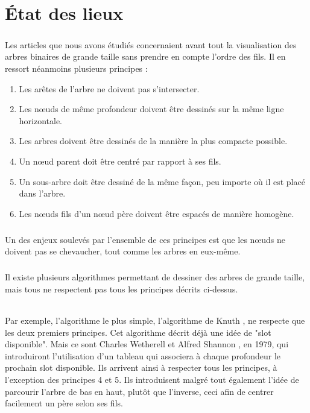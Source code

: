 \chapter{État des lieux}

\paragraph{}Les articles que nous avons étudiés concernaient avant tout la visualisation des arbres binaires de grande taille sans prendre en compte l'ordre des fils. Il en ressort néanmoins plusieurs principes :
\begin{enumerate}
	\item Les arêtes de l'arbre ne doivent pas s'intersecter.
	\item Les n\oe{}uds de même profondeur doivent être dessinés sur la même ligne horizontale.
	\item Les arbres doivent être dessinés de la manière la plus compacte possible.
	\item Un n\oe{}ud parent doit être centré par rapport à ses fils.
	\item Un sous-arbre doit être dessiné de la même façon, peu importe où il est placé dans l'arbre.
	\item Les n\oe{}uds fils d'un n\oe{}ud père doivent être espacés de manière homogène.
\end{enumerate}

\paragraph{}Un des enjeux soulevés par l'ensemble de ces principes est que les n\oe{}uds ne doivent pas se chevaucher, tout comme les arbres en eux-même.

\paragraph{}Il existe plusieurs algorithmes permettant de dessiner des arbres de grande taille, mais tous ne respectent pas tous les principes décrits ci-dessus.

\subparagraph{}Par exemple, l'algorithme le plus simple, l'algorithme de Knuth \cite{REF_Knuth}, ne respecte que les deux premiers principes. Cet algorithme décrit déjà une idée de "slot disponible". Mais ce sont Charles Wetherell et Alfred Shannon \cite{REF_Wetherell}, en 1979, qui introduiront l'utilisation d'un tableau qui associera à chaque profondeur le prochain slot disponible. Ils arrivent ainsi à respecter tous les principes, à l'exception des principes 4 et 5. Ils introduisent malgré tout également l'idée de parcourir l'arbre de bas en haut, plutôt que l'inverse, ceci afin de centrer facilement un père selon ses fils.

